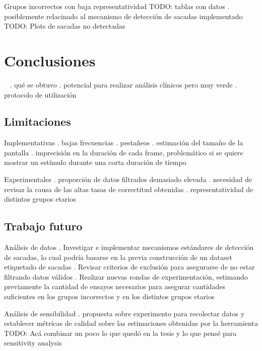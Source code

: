 \documentclass{beamer}
\begin{document}
\begin{frame}{Grupos incorrectos con baja representatividad}
TODO: tablas con datos
. posiblemente relacinado al mecanismo de detección de sacadas implementado
TODO: Plots de sacadas no detectadas
\end{frame}

\section{Conclusiones}

\begin{frame}{~}
. qué se obtuvo
. potencial para realizar análisis clínicos pero muy verde
. protocolo de utilización
\end{frame}

\subsection{Limitaciones}

\begin{frame}{Implementativas}
. bajas frecuencias
. pestañeos
. estimación del tamaño de la pantalla
. imprecisión en la duración de cada frame, problemático si se quiere mostrar
  un estímulo durante una corta duración de tiempo
\end{frame}

\begin{frame}{Experimentales}
. proporción de datos filtrados demasiado elevada
. necesidad de revisar la causa de las altas tasas de correctitud obtenidas
. representatividad de distintos grupos etarios
\end{frame}

\subsection{Trabajo futuro}

\begin{frame}{Análisis de datos}
. Investigar e implementar mecanismos estándares de detección de sacadas, lo
  cual podría basarse en la previa construcción de un dataset etiquetado de
  sacadas
. Revisar criterios de exclusión para asegurarse de no estar filtrando datos
  válidos
. Realizar nuevas rondas de experimentación, estimando previamente la cantidad
  de ensayos necesarios para asegurar cantidades suficientes en los grupos
  incorrectos y en los distintos grupos etarios
\end{frame}

\begin{frame}{Análisis de sensibilidad}
. propuesta sobre experimento para recolectar datos y establecer métricas de
  calidad sobre las estimaciones obtenidas por la herramienta
TODO: Acá combinar un poco lo que quedó en la tesis y lo que pensé para
      sensitivity analysis
\end{frame}
\end{document}
